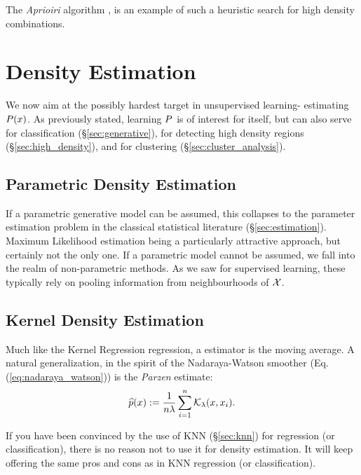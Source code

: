 The \emph{Aprioiri} algorithm \cite{agraval_fast_1994}, is an example of such a heuristic search for high density combinations.






\section{Density Estimation}
\label{sec:density_estimation}

We now aim at the possibly hardest target in unsupervised learning- estimating $P(x)$.
As previously stated, learning $P$ is of interest for itself, but can also serve for classification (\S\ref{sec:generative}), for detecting high density regions (\S\ref{sec:high_density}), and for clustering (\S\ref{sec:cluster_analysis}).




\subsection{Parametric Density Estimation}
If a parametric generative model can be assumed, this collapses to the parameter estimation problem in the classical statistical literature (\S\ref{sec:estimation}). Maximum Likelihood estimation being a particularly attractive approach, but certainly not the only one.
If a parametric model cannot be assumed, we fall into the realm of non-parametric methods. 
As we saw for supervised learning, these typically rely on pooling information from neighbourhoods of $\mathcal{X}$.



\subsection{Kernel Density Estimation}
\label{sec:kernel_density}

Much like the Kernel Regression regression, a \naive estimator is the moving average.
A natural generalization, in the spirit of the Nadaraya-Watson smoother (Eq.(\ref{eq:nadaraya_watson})) is the \emph{Parzen} estimate:
\begin{align}
\label{eq:parzen}
	\widehat{p}(x):=\frac{1}{n \lambda} \sum_{i=1}^n \mathcal{K}_\lambda(x,x_i).
\end{align}

\begin{remark}
If you have been convinced by the use of KNN (\S\ref{sec:knn}) for regression (or classification), there is no reason not to use it for density estimation. It will keep offering the same pros and cons as in KNN regression (or classification).
\end{remark}

